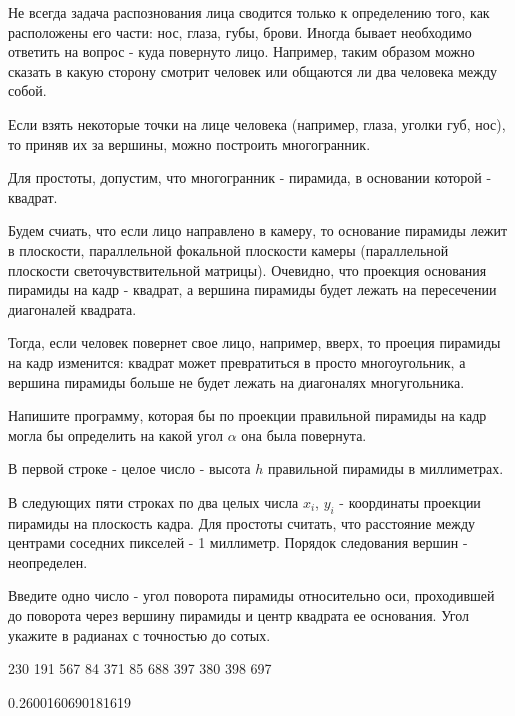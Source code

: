 
Не всегда задача распознования лица сводится только к определению того, как расположены его части: нос, глаза, губы, брови. Иногда бывает необходимо ответить на вопрос - куда повернуто лицо. Например, таким образом можно сказать в какую сторону смотрит человек или общаются ли два человека между собой.

Если взять некоторые точки на лице человека (например, глаза, уголки губ, нос), то приняв их за вершины, можно построить многогранник.


Для простоты, допустим, что многогранник - пирамида, в основании которой - квадрат.


Будем счиать, что если лицо направлено в камеру, то основание пирамиды лежит в плоскости, параллельной фокальной плоскости камеры (параллельной плоскости светочувствительной матрицы). Очевидно, что проекция основания пирамиды на кадр - квадрат, а вершина пирамиды будет лежать на пересечении диагоналей квадрата.

Тогда, если человек повернет свое лицо, например, вверх, то проеция пирамиды на кадр изменится: квадрат может превратиться в просто многоугольник, а вершина пирамиды больше не будет лежать на диагоналях многугольника.


Напишите программу, которая бы по проекции правильной пирамиды на кадр могла бы определить на какой угол $\alpha$ она была повернута.


В первой строке - целое число - высота $h$ правильной пирамиды в миллиметрах. 

В следующих пяти строках по два целых числа $x_i$, $y_i$ - координаты проекции пирамиды на плоскость кадра. 
Для простоты считать, что расстояние между центрами соседних пикселей - 1 миллиметр. Порядок следования вершин - 
неопределен.

\outputfmtSection

Введите одно число - угол поворота пирамиды относительно оси, проходившей до поворота через вершину пирамиды и центр квадрата ее основания. Угол укажите в радианах с точностью до сотых.

\begin{myverbbox}[\small]{\vinput} 
    230
    191 567
    84 371
    85 688
    397 380
    398 697
\end{myverbbox}
\begin{myverbbox}[\small]{\voutput}
    0.2600160690181619
\end{myverbbox}

